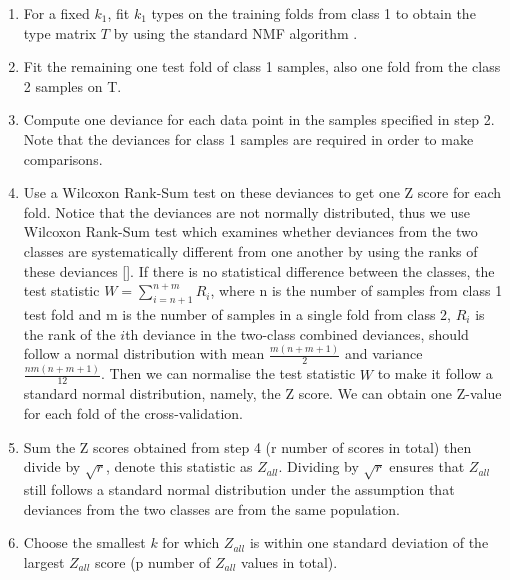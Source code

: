 \documentclass[a4paper,12pt]{article}
\begin{document}
\begin{enumerate}
	\item For a fixed $k_{1}$, fit $k_{1}$ types on the training folds from class 1 to obtain the type matrix $T$ by using the standard NMF algorithm .
	\item Fit the remaining one test fold of class 1 samples, also one fold from the class 2 samples on T.
	\item Compute one deviance for each data point in the samples specified in step 2. Note that the deviances for class 1 samples are required in order to make comparisons.
	\item Use a Wilcoxon Rank-Sum test on these deviances to get one Z score for each fold. Notice that the deviances are not normally distributed, thus we use Wilcoxon Rank-Sum test which examines whether deviances from the two classes are systematically different from one another by using the ranks of these deviances [\cite{wilcoxon1992individual}]. If there is no statistical difference between the classes, the test statistic $W = \sum_{i = n + 1} ^{n + m} R_{i}$, where n is the number of samples from class 1 test fold and m is the number of samples in a single fold from class 2, $R_{i}$ is the rank of the $i$th deviance in the two-class combined deviances, should follow a normal distribution with mean $\frac{m(n+m+1)}{2}$ and variance $\frac{nm(n+m+1)}{12}$. Then we can normalise the test statistic $W$ to make it follow a standard normal distribution, namely, the Z score. We can obtain one Z-value for each fold of the cross-validation.
	\item Sum the Z scores obtained from step 4 (r number of scores in total) then divide by $\sqrt{r}$, denote this statistic as $Z_{all}$. Dividing by $\sqrt{r}$ ensures that $Z_{all}$ still follows a standard normal distribution under the assumption that deviances from the two classes are from the same population.
	\item Choose the smallest $k$ for which $Z_{a l l}$ is within one standard deviation of the largest $Z_{a l l}$ score (p number of $Z_{a l l}$ values in total). 
\end{enumerate}
\end{document}
